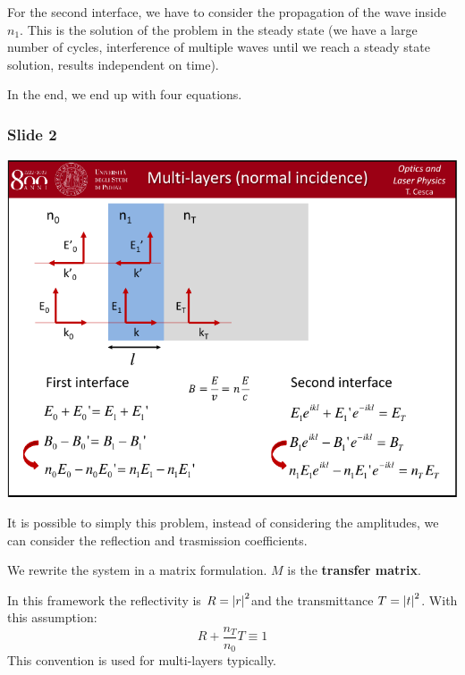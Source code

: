 \documentclass[../main/main.tex]{subfiles}
\begin{document}
For the second interface, we have to consider the propagation of the wave inside \( n_1 \). This is the solution of the problem in the steady state (we have a large number of cycles, interference of multiple waves until we reach a steady state solution, results independent on time).

In the end, we end up with four equations.

\subsubsection*{Slide 2}

\begin{minipage}[]{0.5\linewidth}
\centering
\includegraphics[page=2,width=1\textwidth]{../lessons/pdf_file/06_lecture.pdf}
\end{minipage}
\hspace{0.3cm}\vspace{0.3cm}
\begin{minipage}[c]{0.47\linewidth}

It is possible to simply this problem, instead of considering the amplitudes, we can consider the reflection and trasmission coefficients.

We rewrite the system in a matrix formulation. \( M \) is the \textbf{transfer matrix}.

In this framework the reflectivity is \( R= \abs{r}^2  \)and the transmittance \( T = \abs{t}^2  \). With this assumption:
\begin{equation*}
  R + \frac{n_T}{n_0} T \equiv 1
\end{equation*}
This convention is used for multi-layers typically.

\end{minipage}
\end{document}
